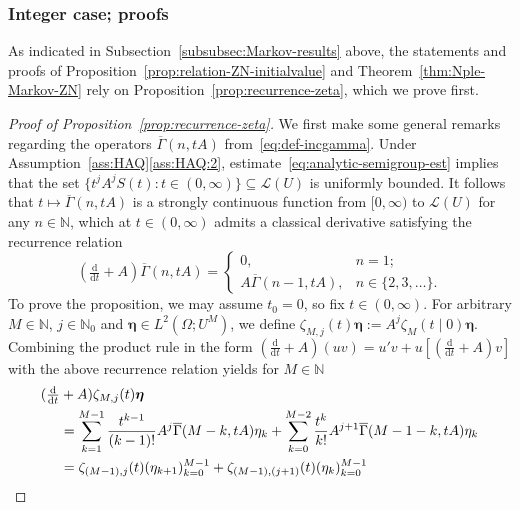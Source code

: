 \documentclass[reqno]{amsart}
\numberwithin{equation}{section}
\newcommand{\N}{\mathbb{N}}
\theoremstyle{remark}
\theoremstyle{definition}
\begin{document}
\subsubsection{Integer case; proofs}
\label{subsubsec:Markov-proofs}
As indicated in Subsection~\ref{subsubsec:Markov-results} above, 
the statements and proofs of Proposition~\ref{prop:relation-ZN-initialvalue} and Theorem~\ref{thm:Nple-Markov-ZN} 
rely on Proposition~\ref{prop:recurrence-zeta}, which we prove first.

\begin{proof}[Proof of Proposition~\ref{prop:recurrence-zeta}]
	We first make some general remarks regarding the operators $\overline\Gamma(n, tA)$
	from~\eqref{eq:def-incgamma}.
	Under Assumption~\ref{ass:HAQ}\ref{ass:HAQ:2},
	estimate~\eqref{eq:analytic-semigroup-est} implies that
	the set $\{t^j A^jS(t) : t \in (0,\infty)\} \subseteq \mathscr{L}(U)$ is uniformly bounded.
	It follows that
	$t \mapsto \overline\Gamma(n, tA)$ 
	is a strongly continuous
	function from $[0,\infty)$ to $\mathscr{L}(U)$ for any $n \in \N$,
	which at $t \in (0,\infty)$ admits a classical derivative
	satisfying the recurrence relation
	\begin{equation}\label{eq:recurrence-incompletegamma}
		\left(\tfrac{\mathrm d}{\mathrm d t} + A\right)\overline{\Gamma}(n, tA) 
		= 
		\begin{cases}
			0, &n = 1; \\
			A\overline{\Gamma}(n-1, tA), &n \in \{2,3,\dots\}.
		\end{cases}
	\end{equation} 
	To prove the proposition, we may assume $t_0 = 0$, so fix $t \in (0,\infty)$.
	For arbitrary $M \in \N$, $j \in \N_0$ and $\bm\eta \in L^2(\Omega; U^{M})$, we define
	$
	\zeta_{M,j}(t) \bm\eta
	:= 
	A^j \zeta_{M}(t \mid 0) \bm\eta.
	$
	Combining the product rule in the form 
	$(\frac{\mathrm d}{\mathrm dt} + A)(uv) = u'v + u[(\frac{\mathrm d}{\mathrm dt} + A)v]$
	with the above recurrence relation yields for $M \in \N$
	\begin{align}
		(\tfrac{\mathrm d}{\mathrm dt} &+ A)\zeta_{M,j}(t) \bm \eta
		\\&=
		\sum_{k=1}^{M-1} \frac{t^{k-1}}{(k-1)!} A^j \overline\Gamma(M-k, tA) \eta_k
		+
		\sum_{k=0}^{M-2} \frac{t^k}{k!} A^{j+1} \overline\Gamma(M-1-k, tA) \eta_k
		\notag
		\\
		&=
		\zeta_{(M-1),j}(t) (\eta_{k+1})_{k=0}^{M-1} + \zeta_{(M-1),(j+1)}(t) (\eta_{k})_{k=0}^{M-1}

\end{align}
\end{proof}
\end{document}
